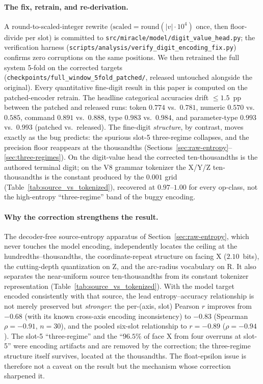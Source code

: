 \documentclass[entropy,article,submit,moreauthors,pdftex]{Definitions/mdpi}
\begin{document}
\paragraph{The fix, retrain, and re-derivation.} A round-to-scaled-integer rewrite ($\text{scaled}=\text{round}(|v|\cdot 10^{4})$ once, then floor-divide per slot) is committed to \texttt{src/miracle/model/digit\_value\_head.py}; the verification harness (\texttt{scripts/analysis/verify\_digit\_encoding\_fix.py}) confirms zero corruptions on the same positions. We then retrained the full system 5-fold on the corrected targets (\texttt{checkpoints/full\_window\_5fold\_patched/}, released untouched alongside the original). Every quantitative fine-digit result in this paper is computed on the patched-encoder retrain. The headline categorical accuracies drift $\le\!1.5$~pp between the patched and released runs: token $0.774$ vs.\ $0.781$, numeric $0.570$ vs.\ $0.585$, command $0.891$ vs.\ $0.888$, type $0.983$ vs.\ $0.984$, and parameter-type $0.993$ vs.\ $0.993$ (patched vs.\ released). The fine-digit \emph{structure}, by contrast, moves exactly as the bug predicts: the spurious slot-5 three-regime collapses, and the precision floor reappears at the thousandths (Sections~\ref{sec:raw-entropy}--\ref{sec:three-regimes}). On the digit-value head the corrected ten-thousandths is the authored terminal digit; on the V8 grammar tokenizer the X/Y/Z ten-thousandths is the constant produced by the $0.001$ grid (Table~\ref{tab:source_vs_tokenized}), recovered at $0.97$--$1.00$ for every op-class, not the high-entropy ``three-regime'' band of the buggy encoding.

\paragraph{Why the correction strengthens the result.} The decoder-free source-entropy apparatus of Section~\ref{sec:raw-entropy}, which never touches the model encoding, independently locates the ceiling at the hundredths--thousandths, the coordinate-repeat structure on facing X ($2.10$~bits), the cutting-depth quantization on Z, and the arc-radius vocabulary on R. It also separates the near-uniform source ten-thousandths from its constant tokenizer representation (Table~\ref{tab:source_vs_tokenized}). With the model target encoded consistently with that source, the lead entropy--accuracy relationship is not merely preserved but \emph{stronger}: the per-(axis, slot) Pearson $r$ improves from $-0.68$ (with its known cross-axis encoding inconsistency) to $-0.83$ (Spearman $\rho=-0.91$, $n=30$), and the pooled six-slot relationship to $r=-0.89$ ($\rho=-0.94$). The slot-5 ``three-regime'' and the ``$96.5\%$ of face X from four overruns at slot-5'' were encoding artifacts and are removed by the correction; the three-regime structure itself survives, located at the thousandths. The float-epsilon issue is therefore not a caveat on the result but the mechanism whose correction sharpened it.
\end{document}
